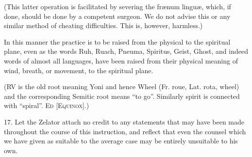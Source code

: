 (This latter operation is facilitated by severing the fr\ae{}num lingu\ae{}, which, if done, should be done by a competent surgeon. We do not advise this or any similar method of cheating difficulties. This is, however, harmless.)

In this manner the practice is to be raised from the physical to the spiritual plane, even as the words Ruh, Ruach, Pneuma, Spiritus, Geist, Ghost, and indeed words of almost all languages, have been raised from their physical meaning of wind, breath, or movement, to the spiritual plane.

(RV is the old root meaning Yoni and hence Wheel (Fr. roue, Lat. rota, wheel) and the corresponding Semitic root means \enquote{to go}. Similarly spirit is connected with \enquote{spiral}. \textemdash{} \textsc{Ed [Equinox]}.)

17. Let the Zelator attach no credit to any statements that may have been made throughout the course of this instruction, and reflect that even the counsel which we have given as suitable to the average case may be entirely unsuitable to his own.

